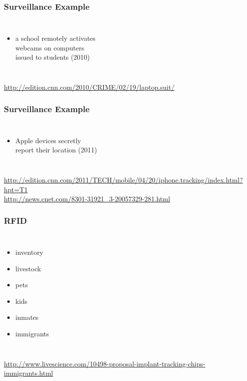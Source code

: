 \documentclass[dvipsnames]{beamer}
\theoremstyle{plain}
\begin{document}
\begin{frame}
  \frametitle{Surveillance Example}

  \begin{columns}

    \begin{itemize}
      \item a school remotely activates\\
        webcams on computers\\
        issued to students (2010)
    \end{itemize}
  \end{columns}

  \medskip
  \tiny{\url{http://edition.cnn.com/2010/CRIME/02/19/laptop.suit/}}\\
\end{frame}

\begin{frame}
  \frametitle{Surveillance Example}

  \begin{columns}

    \begin{itemize}
      \item Apple devices secretly\\
        report their location (2011)
    \end{itemize}
  \end{columns}

  \medskip
  \tiny{\url{http://edition.cnn.com/2011/TECH/mobile/04/20/iphone.tracking/index.html?hpt=T1}}\\
  \smallskip
  \tiny{\url{http://news.cnet.com/8301-31921_3-20057329-281.html}}\\
\end{frame}

\begin{frame}
  \frametitle{RFID}

  \begin{columns}
    \begin{itemize}
      \item inventory
      \item livestock

      \pause
      \medskip
      \item pets
      \item kids
      \item inmates
      \item immigrants
    \end{itemize}

  \end{columns}

  \medskip
  \tiny{\url{http://www.livescience.com/10498-proposal-implant-tracking-chips-immigrants.html}}\\
\end{frame}
\end{document}
